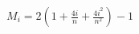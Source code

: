 \documentclass[preview]{standalone}
\begin{document}
\begin{align*}
M_i = 2\left(1 + \frac{4i}{n} + \frac{4i^2}{n^2}\right) - 1
\end{align*}
\end{document}
